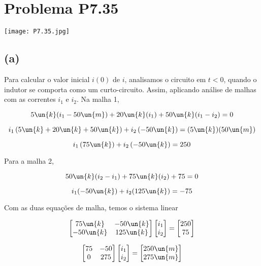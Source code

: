 
\section*{Problema P7.35}

\renewcommand*\thesection{7.35}

\begin{center}
    \texttt{[image: P7.35.jpg]}
\end{center}

\subsection*{(a)}

Para calcular o valor inicial $i(0)$ de $i$, analisamos o circuito em $t<0$, quando o indutor se comporta como um curto-circuito.
Assim, aplicando análise de malhas com as correntes $i_1$ e $i_2$. Na malha 1,

\[ 5\un{k}(i_1 - 50\un{m}) + 20\un{k}(i_1) + 50\un{k}(i_1 - i_2) = 0 \]

\[ i_1\left(5\un{k} + 20\un{k} + 50\un{k}\right) + i_2\left(- 50\un{k}\right) = ( 5\un{k})(50\un{m}) \]

\[ i_1\left(75\un{k}\right) + i_2\left(- 50\un{k}\right) = 250 \]

Para a malha 2,   

\[ 50\un{k}(i_2 - i_1) + 75\un{k}(i_2) + 75 = 0 \]

\[ i_1(-50\un{k}) + i_2(125\un{k}) = -75 \]

Com as duas equações de malha, temos o sistema linear   

\begingroup
\renewcommand*{\arraystretch}{3}

\[
    \begin{bmatrix}
        75\un{k} & -50\un{k}   \\
        -50\un{k}    & 125\un{k}
    \end{bmatrix}
    \begin{bmatrix}
        i_1 \\
        i_2
    \end{bmatrix}
    =
    \begin{bmatrix}
        250 \\
        75
    \end{bmatrix}
\]

\[
    \begin{bmatrix}
        75 & -50   \\
        0    & 275
    \end{bmatrix}
    \begin{bmatrix}
        i_1 \\
        i_2
    \end{bmatrix}
    =
    \begin{bmatrix}
        250\un{m} \\
        275\un{m}
    \end{bmatrix}
\]

